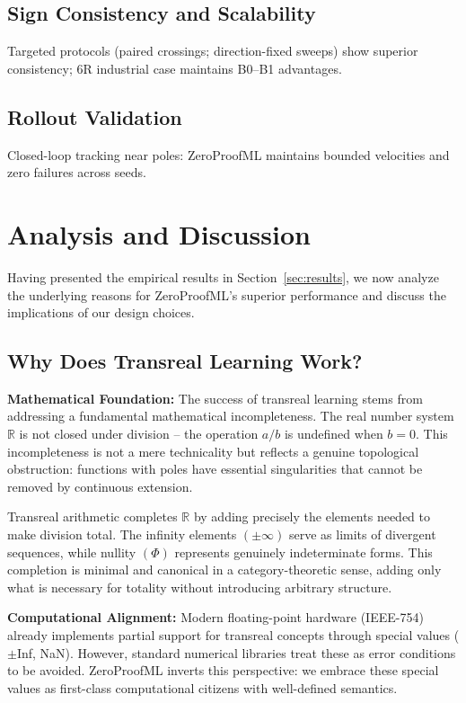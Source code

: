 \documentclass[twoside,11pt]{article}
\begin{document}
\subsection{Sign Consistency and Scalability}
Targeted protocols (paired crossings; direction-fixed sweeps) show superior consistency; 6R industrial case maintains B0--B1 advantages.
\subsection{Rollout Validation}
Closed-loop tracking near poles: ZeroProofML maintains bounded velocities and zero failures across seeds.

\section{Analysis and Discussion}
\label{sec:analysis}
Having presented the empirical results in Section~\ref{sec:results}, we now analyze the underlying reasons for ZeroProofML's superior performance and discuss the implications of our design choices.

\subsection{Why Does Transreal Learning Work?}

\textbf{Mathematical Foundation:} The success of transreal learning stems from addressing a fundamental mathematical incompleteness. The real number system $\mathbb{R}$ is not closed under division -- the operation $a/b$ is undefined when $b=0$. This incompleteness is not a mere technicality but reflects a genuine topological obstruction: functions with poles have essential singularities that cannot be removed by continuous extension.

Transreal arithmetic completes $\mathbb{R}$ by adding precisely the elements needed to make division total. The infinity elements $(\pm\infty)$ serve as limits of divergent sequences, while nullity $(\Phi)$ represents genuinely indeterminate forms. This completion is minimal and canonical in a category-theoretic sense, adding only what is necessary for totality without introducing arbitrary structure.

\textbf{Computational Alignment:} Modern floating-point hardware (IEEE-754) already implements partial support for transreal concepts through special values ($\pm$Inf, NaN). However, standard numerical libraries treat these as error conditions to be avoided. ZeroProofML inverts this perspective: we embrace these special values as first-class computational citizens with well-defined semantics.
\end{document}
